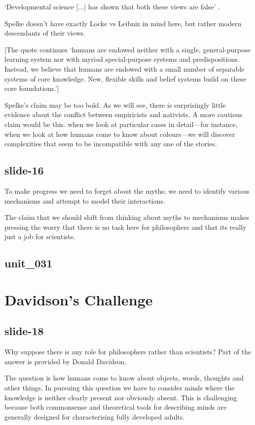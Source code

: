 \documentclass[12pt,\papersize]{extarticle}
\begin{document}
‘Developmental science [...] has shown that both these views are false’
\citep[p.\ 89]{Spelke:2007hb}.

Spelke doesn't have exactly Locke vs Leibniz in mind here, but rather modern descendants
of their views.

[The quote continues ‘humans are endowed neither with a single, general-purpose learning system
nor with myriad special-purpose systems and predispositions. Instead, we believe that humans
are endowed with a small number of separable systems of core knowledge. New, flexible skills
and belief systems build on these core foundations.’]

Spelke's claim may be too bold.  As we will see, there is surprisingly little evidence about
the conflict between empiricists and nativists.
A more cautious claim would be this.  when we look at particular cases in detail---for
instance,
when we look at how humans come to know about colours---we will discover complexities that seem
to be incompatible with any one of the stories.

\subsection{slide-16}
To make progress we need to forget about the myths; we need to
identify various mechanisms and attempt to model their interactions.

The claim that we should shift from thinking about myths to mechanisms makes pressing
the worry that there is no task here for philosophers and that its really just a job for
scientists.

\subsection{unit\_031}


\section{Davidson’s Challenge}

\subsection{slide-18}
Why suppose there is any role for philosophers rather than scientists?
Part of the answer is provided by Donald Davidson.

The question is how humans come to know about objects, words, thoughts and other things.
In pursuing this question we have to consider minds where the knowledge is neither clearly
present nor obviously absent.
This is challenging because both commonsense and theoretical tools for describing minds are
generally designed for characterising fully developed adults.
\end{document}
